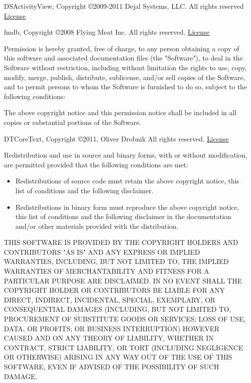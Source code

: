 \documentclass[oneside, openany, 12pt]{tufte-book}
\newcommand{\licensetext}{\scriptsize \setlength{\parskip}{0mm} \singlespacing}
\begin{document}
DSActivityView, Copyright \copyright 2009-2011 Dejal Systems, LLC. All rights reserved \href{https://dejal.svn.beanstalkapp.com/open/DSActivityView/Sources/DSActivityView.h}{License}

fmdb, Copyright \copyright 2008 Flying Meat Inc. All rights reserved. \href{https://raw.github.com/ccgus/fmdb/master/LICENSE.txt}{License}

{\licensetext Permission is hereby granted, free of charge, to any person obtaining a copy
of this software and associated documentation files (the "Software"), to deal
in the Software without restriction, including without limitation the rights
to use, copy, modify, merge, publish, distribute, sublicense, and/or sell
copies of the Software, and to permit persons to whom the Software is
furnished to do so, subject to the following conditions:

The above copyright notice and this permission notice shall be included in
all copies or substantial portions of the Software.}

DTCoreText, Copyright \copyright 2011, Oliver Drobnik All rights reserved. \href{https://raw.github.com/Cocoanetics/DTCoreText/master/LICENSE}{License}

{\licensetext Redistribution and use in source and binary forms, with or without
modification, are permitted provided that the following conditions are met:

\begin{itemize}
\item Redistributions of source code must retain the above copyright notice, this
list of conditions and the following disclaimer. 

\item Redistributions in binary form must reproduce the above copyright notice,
this list of conditions and the following disclaimer in the documentation
and/or other materials provided with the distribution.
\end{itemize}

THIS SOFTWARE IS PROVIDED BY THE COPYRIGHT HOLDERS AND CONTRIBUTORS "AS IS"
AND ANY EXPRESS OR IMPLIED WARRANTIES, INCLUDING, BUT NOT LIMITED TO, THE
IMPLIED WARRANTIES OF MERCHANTABILITY AND FITNESS FOR A PARTICULAR PURPOSE ARE
DISCLAIMED. IN NO EVENT SHALL THE COPYRIGHT HOLDER OR CONTRIBUTORS BE LIABLE
FOR ANY DIRECT, INDIRECT, INCIDENTAL, SPECIAL, EXEMPLARY, OR CONSEQUENTIAL
DAMAGES (INCLUDING, BUT NOT LIMITED TO, PROCUREMENT OF SUBSTITUTE GOODS OR
SERVICES; LOSS OF USE, DATA, OR PROFITS; OR BUSINESS INTERRUPTION) HOWEVER
CAUSED AND ON ANY THEORY OF LIABILITY, WHETHER IN CONTRACT, STRICT LIABILITY,
OR TORT (INCLUDING NEGLIGENCE OR OTHERWISE) ARISING IN ANY WAY OUT OF THE USE
OF THIS SOFTWARE, EVEN IF ADVISED OF THE POSSIBILITY OF SUCH DAMAGE.}
\end{document}
